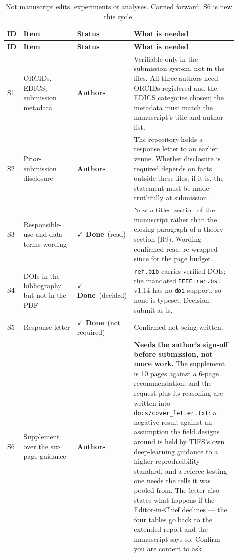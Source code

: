 \documentclass[11pt]{article}
\newcommand{\done}{\textcolor{DoneGreen}{\textbf{$\checkmark$ Done}}}
\newcommand{\authors}{\textcolor{RunOrange}{\textbf{Authors}}}
\begin{document}
\begin{longtable}{@{}p{0.05\linewidth}p{0.26\linewidth}p{0.10\linewidth}p{0.51\linewidth}@{}}
\caption{Not manuscript edits, experiments or analyses. Carried forward; S6 is
new this cycle.}
\label{tab:tifs14-authors}\\
\toprule
\textbf{ID} & \textbf{Item} & \textbf{Status} & \textbf{What is needed} \\
\midrule
\endfirsthead
\toprule
\textbf{ID} & \textbf{Item} & \textbf{Status} & \textbf{What is needed} \\
\midrule
\endhead

S1 & ORCIDs, EDICS, submission metadata & \authors & Verifiable only in the
submission system, not in the files. All three authors need ORCIDs registered
and the EDICS categories chosen; the metadata must match the manuscript's
title and author list. \\
\addlinespace

S2 & Prior-submission disclosure & \authors & The repository holds a response
letter to an earlier venue. Whether disclosure is required depends on facts
outside these files; if it is, the statement must be made truthfully at
submission. \\
\addlinespace

S3 & Responsible-use and data-terms wording & \done\ (read) & Now a titled
section of the manuscript rather than the closing paragraph of a theory
section (R9). Wording confirmed read; re-wrapped since for the page budget. \\
\addlinespace

S4 & DOIs in the bibliography but not in the PDF & \done\ (decided) &
\texttt{ref.bib} carries verified DOIs; the mandated \texttt{IEEEtran.bst}
v1.14 has no \texttt{doi} support, so none is typeset. Decision: submit as is. \\
\addlinespace

S5 & Response letter & \done\ (not required) & Confirmed not being written. \\
\addlinespace

S6 & Supplement over the six-page guidance & \authors & \textbf{Needs the
author's sign-off before submission, not more work.} The supplement is 10
pages against a 6-page recommendation, and the request plus its reasoning are
written into \texttt{docs/cover\_letter.txt}: a negative result against an
assumption the field designs around is held by TIFS's own deep-learning
guidance to a higher reproducibility standard, and a referee testing one needs
the cells it was pooled from. The letter also states what happens if the
Editor-in-Chief declines --- the four tables go back to the extended report and
the manuscript says so. Confirm you are content to ask. \\

\bottomrule
\end{longtable}
\end{document}
